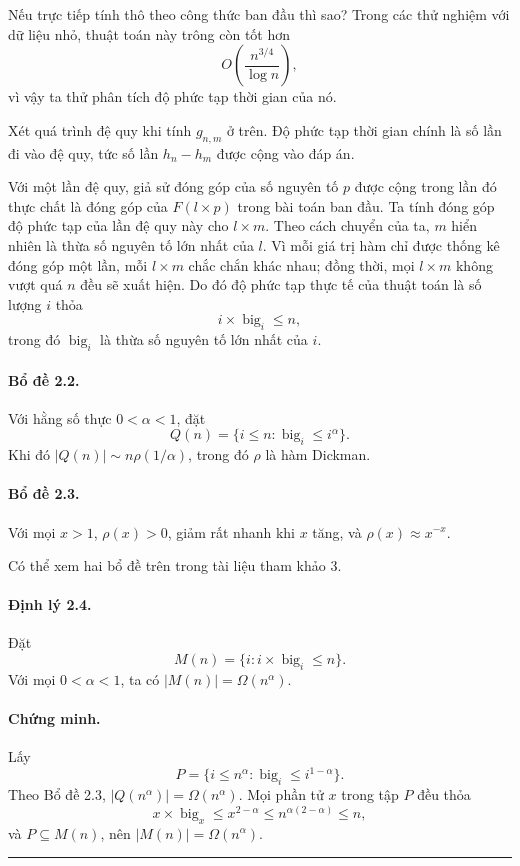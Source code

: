 \documentclass[11pt]{article}
\newcommand{\qedmark}{\hfill\rule{0.7ex}{0.7ex}}
\begin{document}
Nếu trực tiếp tính thô theo công thức ban đầu thì sao? Trong các thử nghiệm với
dữ liệu nhỏ, thuật toán này trông còn tốt hơn
\[
  O\left(\frac{n^{3/4}}{\log n}\right),
\]
vì vậy ta thử phân tích độ phức tạp thời gian của nó.

Xét quá trình đệ quy khi tính \(g_{n,m}\) ở trên. Độ phức tạp thời gian chính
là số lần đi vào đệ quy, tức số lần \(h_n-h_m\) được cộng vào đáp án.

Với một lần đệ quy, giả sử đóng góp của số nguyên tố \(p\) được cộng trong lần
đó thực chất là đóng góp của \(F(l\times p)\) trong bài toán ban đầu. Ta tính
đóng góp độ phức tạp của lần đệ quy này cho \(l\times m\). Theo cách chuyển của
ta, \(m\) hiển nhiên là thừa số nguyên tố lớn nhất của \(l\). Vì mỗi giá trị
hàm chỉ được thống kê đóng góp một lần, mỗi \(l\times m\) chắc chắn khác nhau;
đồng thời, mọi \(l\times m\) không vượt quá \(n\) đều sẽ xuất hiện. Do đó độ
phức tạp thực tế của thuật toán là số lượng \(i\) thỏa
\[
  i\times \operatorname{big}_i\le n,
\]
trong đó \(\operatorname{big}_i\) là thừa số nguyên tố lớn nhất của \(i\).

\paragraph{Bổ đề 2.2.}
Với hằng số thực \(0<\alpha<1\), đặt
\[
  Q(n)=\{i\le n:\operatorname{big}_i\le i^\alpha\}.
\]
Khi đó \(|Q(n)|\sim n\rho(1/\alpha)\), trong đó \(\rho\) là hàm Dickman.

\paragraph{Bổ đề 2.3.}
Với mọi \(x>1\), \(\rho(x)>0\), giảm rất nhanh khi \(x\) tăng, và
\(\rho(x)\approx x^{-x}\).

Có thể xem hai bổ đề trên trong tài liệu tham khảo 3.

\paragraph{Định lý 2.4.}
Đặt
\[
  M(n)=\{i:i\times \operatorname{big}_i\le n\}.
\]
Với mọi \(0<\alpha<1\), ta có \(|M(n)|=\Omega(n^\alpha)\).

\paragraph{Chứng minh.}
Lấy
\[
  P=\{i\le n^\alpha:\operatorname{big}_i\le i^{1-\alpha}\}.
\]
Theo Bổ đề 2.3, \(|Q(n^\alpha)|=\Omega(n^\alpha)\). Mọi phần tử \(x\) trong
tập \(P\) đều thỏa
\[
  x\times \operatorname{big}_x\le x^{2-\alpha}
  \le n^{\alpha(2-\alpha)}\le n,
\]
và \(P\subseteq M(n)\), nên \(|M(n)|=\Omega(n^\alpha)\). \qedmark
\end{document}
